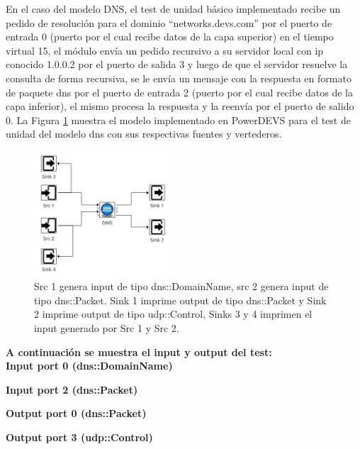 \documentclass[10pt,a4paper]{article}
\begin{document}
En el caso del modelo DNS, el test de unidad básico implementado recibe un pedido de resolución para el dominio ``networks.devs.com'' por el puerto de entrada 0 (puerto por el cual recibe datos de la capa superior) en el tiempo virtual 15, el módulo envía un pedido recursivo a su servidor local con ip conocido 1.0.0.2 por el puerto de salida 3 y luego de que el servidor resuelve la consulta de forma recursiva, se le envía un mensaje con la respuesta en formato de paquete dns por el puerto de entrada 2 (puerto por el cual recibe datos de la capa inferior), el mismo procesa la respuesta y la reenvía por el puerto de salido 0. La Figura \ref{figure: unit test dns} muestra el modelo implementado en PowerDEVS para el test de unidad del modelo dns con sus respectivas fuentes y vertederos.

\begin{figure}[!b]
    \centering
    \includegraphics[width = 0.45\textwidth]{img/png/unit_tests/dns.png}
    \caption{Src 1 genera input de tipo dns::DomainName, src 2 genera input de tipo dns::Packet. Sink 1 imprime output de tipo dns::Packet y Sink 2 imprime output de tipo udp::Control, Sinks 3 y 4 imprimen el input generado por Src 1 y Src 2.}
    \label{figure: unit test dns}
\end{figure}

\textbf{A continuación se muestra el input y output del test:} \\

\textbf{Input port 0 (dns::DomainName)}


\textbf{Input port 2 (dns::Packet)}


\textbf{Output port 0 (dns::Packet)}


\newpage

\textbf{Output port 3 (udp::Control)}

\end{document}

